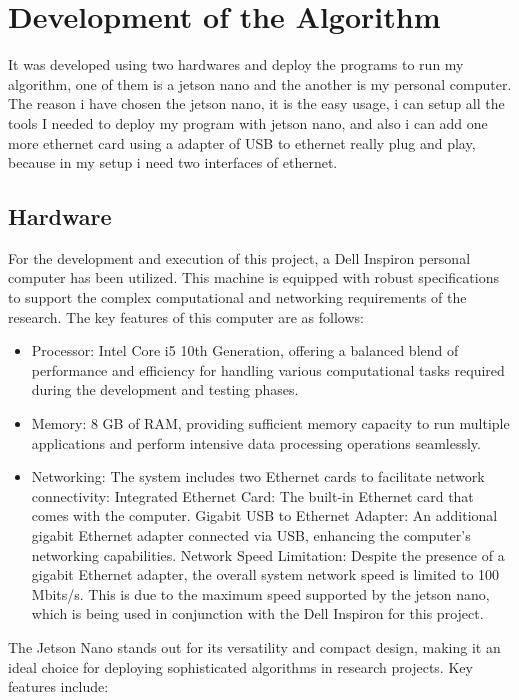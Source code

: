 \section{Development of the Algorithm}

It was developed using two hardwares and deploy the programs to run my algorithm, one of them is a jetson nano and the another is my personal computer. The reason i have chosen the jetson nano, it is the easy usage, i can setup all the tools I needed to deploy my program with jetson nano, and also i can add one more ethernet card using a adapter of USB to ethernet really plug and play, because in my setup i need two interfaces of ethernet.

\subsection{Hardware}

For the development and execution of this project, a Dell Inspiron personal computer has been utilized. This machine is equipped with robust specifications to support the complex computational and networking requirements of the research. The key features of this computer are as follows:

\begin{itemize}
	\item Processor: Intel Core i5 10th Generation, offering a balanced blend of performance and efficiency for handling various computational tasks required during the development and testing phases.
	\item Memory: 8 GB of RAM, providing sufficient memory capacity to run multiple applications and perform intensive data processing operations seamlessly.
	\item Networking: The system includes two Ethernet cards to facilitate network connectivity:
	Integrated Ethernet Card: The built-in Ethernet card that comes with the computer.
	Gigabit USB to Ethernet Adapter: An additional gigabit Ethernet adapter connected via USB, enhancing the computer’s networking capabilities.
	Network Speed Limitation: Despite the presence of a gigabit Ethernet adapter, the overall system network speed is limited to 100 Mbits/s. This is due to the maximum speed supported by the jetson nano, which is being used in conjunction with the Dell Inspiron for this project.
\end{itemize} 

The Jetson Nano stands out for its versatility and compact design, making it an ideal choice for deploying sophisticated algorithms in research projects. Key features include:

